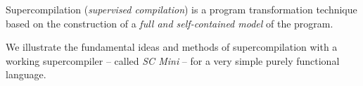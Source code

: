 %

\begin{introduction}
Supercompilation (\emph{supervised compilation}) is a program transformation technique based on
the construction of a \emph{full and self-contained model} of the program.

We illustrate the fundamental ideas and methods of supercompilation with a working
supercompiler -- called \emph{SC Mini} -- for a very simple purely functional language.
\end{introduction}

